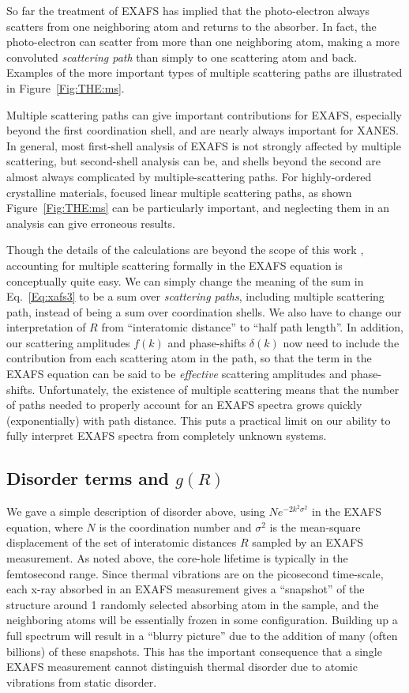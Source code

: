 So far the treatment of EXAFS has implied that the photo-electron always
scatters from one neighboring atom and returns to the absorber.  In fact,
the photo-electron can scatter from more than one neighboring atom, making
a more convoluted {\emph{scattering path}} than simply to one scattering
atom and back.  Examples of the more important types of multiple scattering
paths are illustrated in Figure~\ref{Fig:THE:ms}.

Multiple scattering paths can give important contributions for EXAFS,
especially beyond the first coordination shell, and are nearly always
important for XANES.  In general, most first-shell analysis of EXAFS is not
strongly affected by multiple scattering, but second-shell analysis can be,
and shells beyond the second are almost always complicated by
multiple-scattering paths.  For highly-ordered crystalline materials,
focused linear multiple scattering paths, as shown Figure~\ref{Fig:THE:ms} can
be particularly important, and neglecting them in an analysis can give
erroneous results.

Though the details of the calculations are beyond the scope of this work
\cite{RehrAlbersRMP2000}, accounting for multiple scattering formally in
the EXAFS equation is conceptually quite easy.  We can simply change the
meaning of the sum in Eq.~\ref{Eq:xafs3} to be a sum over {\emph{scattering
    paths}}, including multiple scattering path, instead of being a sum
over coordination shells.  We also have to change our interpretation of $R$
from ``interatomic distance'' to ``half path length''.  In addition, our
scattering amplitudes $f(k)$ and phase-shifts $\delta(k)$ now need to
include the contribution from each scattering atom in the path, so that the
term in the EXAFS equation can be said to be {\emph{effective}} scattering
amplitudes and phase-shifts.  Unfortunately, the existence of multiple
scattering means that the number of paths needed to properly account for an
EXAFS spectra grows quickly (exponentially) with path distance.  This puts
a practical limit on our ability to fully interpret EXAFS spectra from
completely unknown systems.

\subsection{Disorder terms and $g(R)$ }

We gave a simple description of disorder above, using $Ne^{-2k^2\sigma^2}$
in the EXAFS equation, where $N$ is the coordination number and $\sigma^2$
is the mean-square displacement of the set of interatomic distances $R$
sampled by an EXAFS measurement.  As noted above, the core-hole lifetime is
typically in the femtosecond range.  Since thermal vibrations are on the
picosecond time-scale, each x-ray absorbed in an EXAFS measurement gives a
``snapshot'' of the structure around 1 randomly selected absorbing atom in
the sample, and the neighboring atoms will be essentially frozen in some
configuration.  Building up a full spectrum will result in a ``blurry
picture'' due to the addition of many (often billions) of these snapshots.
This has the important consequence that a single EXAFS measurement cannot
distinguish thermal disorder due to atomic vibrations from static disorder.

